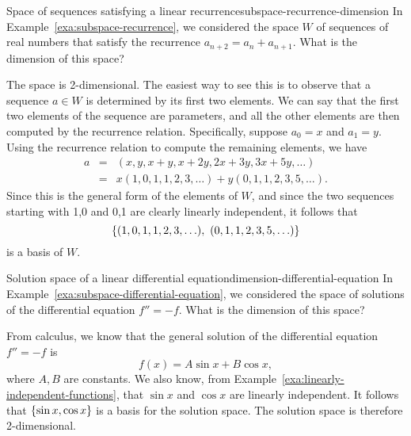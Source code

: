 \begin{example}{Space of sequences satisfying a linear recurrence}{subspace-recurrence-dimension}
  In Example~\ref{exa:subspace-recurrence}, we considered the space
  $W$ of sequences of real numbers that satisfy the recurrence
  $a_{n+2}=a_n+a_{n+1}$. What is the dimension of this space?
\end{example}

\begin{solution}
  The space is 2-dimensional. The easiest way to see this is to
  observe that a sequence $a\in W$ is determined by its first two
  elements. We can say that the first two elements of the sequence are
  parameters, and all the other elements are then computed by the
  recurrence relation. Specifically, suppose $a_0=x$ and
  $a_1=y$. Using the recurrence relation to compute the remaining
  elements, we have
  \begin{eqnarray*}
    a &=& (x,y,x+y,x+2y,2x+3y,3x+5y,\ldots) \\
      &=& x(1,0,1,1,2,3,\ldots) + y(0,1,1,2,3,5,\ldots).
  \end{eqnarray*}
  Since this is the general form of the elements of $W$, and since the
  two sequences starting with 1,0 and 0,1 are clearly linearly
  independent, it follows that
  \begin{equation*}
    \left\{(1,0,1,1,2,3,\ldots),~ (0,1,1,2,3,5,\ldots)\right\}
  \end{equation*}
  is a basis of $W$.
\end{solution}

\begin{example}{Solution space of a linear differential equation}{dimension-differential-equation}
  In Example~\ref{exa:subspace-differential-equation}, we considered
  the space of solutions of the differential equation $f''=-f$. What
  is the dimension of this space?
\end{example}

\begin{solution}
  From calculus, we know that the general solution of the differential
  equation $f''=-f$ is
  \begin{equation*}
    f(x) = A\sin x + B\cos x,
  \end{equation*}
  where $A,B$ are constants. We also know, from
  Example~\ref{exa:linearly-independent-functions}, that $\sin x$ and
  $\cos x$ are linearly independent. It follows that
  $\left\{\sin x, \cos x\right\}$ is a basis for the solution space. The
  solution space is therefore 2-dimensional.
\end{solution}

